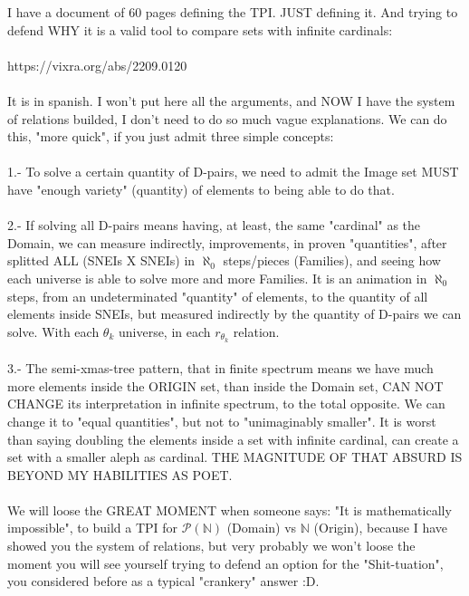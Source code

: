 	\noindent
	I have a document of 60 pages defining the TPI. JUST defining it. And trying to defend WHY it is a valid tool to compare sets with infinite cardinals:\\\\
	https://vixra.org/abs/2209.0120 \\\\
	It is in spanish. I won't put here all the arguments, and NOW I have the system of relations builded, I don't need to do so much vague explanations. We can do this, "more quick", if you just admit three simple concepts:\\\\
	1.- To solve a certain quantity of D-pairs, we need to admit the Image set MUST have "enough variety" (quantity) of elements to being able to do that.\\\\
	2.- If solving all D-pairs means having, at least, the same "cardinal" as the Domain, we can measure indirectly, improvements, in proven "quantities", after splitted ALL (SNEIs X SNEIs) in $\aleph_{0}$ steps/pieces (Families), and seeing how each universe is able to solve more and more Families. It is an animation in $\aleph_{0}$ steps, from an undeterminated "quantity" of elements, to the quantity of all elements inside SNEIs, but measured indirectly by the quantity of D-pairs we can solve. With each $\theta_{k}$ universe, in each $r_{\theta_{k}}$ relation.\\\\
	3.- The semi-xmas-tree pattern, that in finite spectrum means we have much more elements inside the ORIGIN set, than inside the Domain set, CAN NOT CHANGE its interpretation in infinite spectrum, to the total opposite. We can change it to "equal quantities", but not to "unimaginably smaller".  It is worst than saying doubling the elements inside a set with infinite cardinal, can create a set with a smaller aleph as cardinal. THE MAGNITUDE OF THAT ABSURD IS BEYOND MY HABILITIES AS POET.
	\\\\
	
	\noindent
	We will loose the GREAT MOMENT when someone says: "It is mathematically impossible", to build a TPI for $\mathcal{P(\mathbb{N})}$ (Domain) vs $\mathbb{N}$ (Origin), because I have showed you the system of relations, but very probably we won't loose the moment you will see yourself trying to defend an option for the "Shit-tuation", you considered before as a typical "crankery" answer :D.
	\\\\
	

